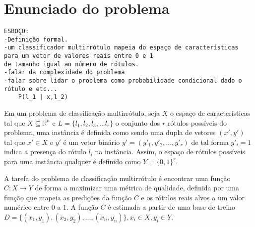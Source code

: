 

\section{Enunciado do problema}
\begin{verbatim}
ESBOÇO:
-Definição formal.
-um classificador multirrótulo mapeia do espaço de características
para um vetor de valores reais entre 0 e 1 
de tamanho igual ao número de rótulos.
-falar da complexidade do problema
-falar sobre lidar o problema como probabilidade condicional dado o rótulo e etc...
    P(l_1 | x,l_2)
\end{verbatim}


Em um problema de classificação multirrótulo, seja $X$ o espaço de características tal que
$X\subseteq \mathbb{R}^n$ e $L=\{l_1,l_2,l_3,...l_r\}$ o conjunto dos $r$ rótulos possíveis do problema,
uma instância é definida como sendo uma dupla de vetores $(x',y')$ tal que $x'\in X$ e $y'$ é um vetor binário
$y'=(y'_1,y'_2,...,y'_r)$ de tal forma $y'_i=1$ indica a presença do rótulo $l_i$ na instância.
Assim, o espaço de rótulos possíveis para uma instância qualquer é definido como $Y=\{0,1\}^r$.

A tarefa do problema de classificação multirrótulo é encontrar uma função $C : X \rightarrow Y$ de forma
a maximizar uma métrica de qualidade, definida por uma função que mapeia as predições da função $C$
e os rótulos reais alvos a um valor numérico entre $0$ a $1$.
A função $C$ é estimada a partir de uma base de treino $D=\{(x_1,y_1),(x_2,y_2),...,(x_n,y_n)\}, x_i\in X, y_i\in Y$.

